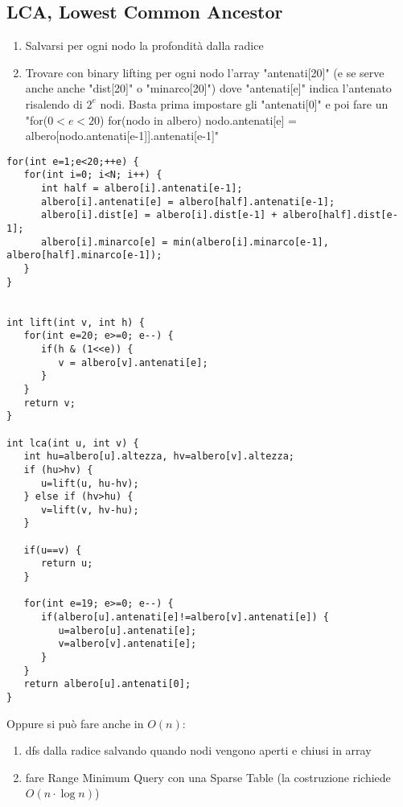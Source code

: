 \subsection{LCA, Lowest Common Ancestor}
\begin{enumerate}
    \item Salvarsi per ogni nodo la profondità dalla radice
    \item Trovare con binary lifting per ogni nodo l’array "antenati[20]" (e se serve anche anche "dist[20]" o "minarco[20]") dove "antenati[e]" indica l’antenato risalendo di $2^e$ nodi. Basta prima impostare gli "antenati[0]" e poi fare un "for($0<e<20$) for(nodo in albero) nodo.antenati[e] = albero[nodo.antenati[e-1]].antenati[e-1]"
\end{enumerate}
\begin{lstlisting}
for(int e=1;e<20;++e) {
   for(int i=0; i<N; i++) {
      int half = albero[i].antenati[e-1];
      albero[i].antenati[e] = albero[half].antenati[e-1];
      albero[i].dist[e] = albero[i].dist[e-1] + albero[half].dist[e-1];
      albero[i].minarco[e] = min(albero[i].minarco[e-1], albero[half].minarco[e-1]);
   }
}


int lift(int v, int h) {
   for(int e=20; e>=0; e--) {
      if(h & (1<<e)) {
         v = albero[v].antenati[e];
      }
   }
   return v;
}

int lca(int u, int v) {
   int hu=albero[u].altezza, hv=albero[v].altezza;
   if (hu>hv) {
      u=lift(u, hu-hv);
   } else if (hv>hu) {
      v=lift(v, hv-hu);
   }

   if(u==v) {
      return u;
   }

   for(int e=19; e>=0; e--) {
      if(albero[u].antenati[e]!=albero[v].antenati[e]) {
         u=albero[u].antenati[e];
         v=albero[v].antenati[e];
      }
   }
   return albero[u].antenati[0];
}
\end{lstlisting}
Oppure si può fare anche in $O(n)$:
\begin{enumerate}
    \item dfs dalla radice salvando quando nodi vengono aperti e chiusi in array
    \item fare Range Minimum Query con una Sparse Table (la costruzione richiede $O(n\cdot \log n)$)
\end{enumerate}

